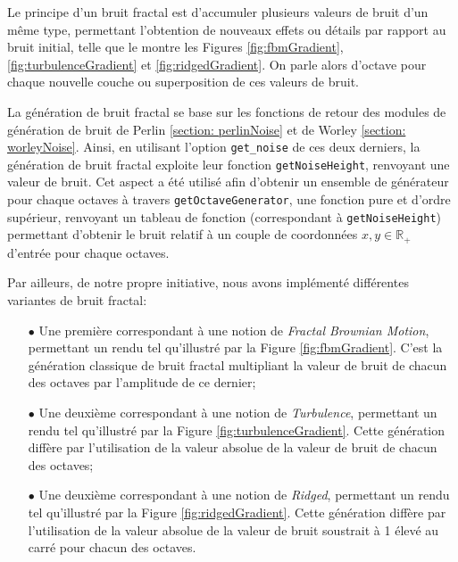 \documentclass[11pt]{article}
\begin{document}
Le principe d'un bruit fractal est d'accumuler plusieurs valeurs de bruit d'un même type, permettant l'obtention de nouveaux effets ou détails par rapport au bruit initial, telle que le montre les Figures \ref{fig:fbmGradient}, \ref{fig:turbulenceGradient} et \ref{fig:ridgedGradient}. On parle alors d'octave pour chaque nouvelle couche ou superposition de ces valeurs de bruit. \cite{fractalNoise}

La génération de bruit fractal se base sur les fonctions de retour des modules de génération de bruit de Perlin \ref{section: perlinNoise} et de Worley \ref{section: worleyNoise}. Ainsi, en utilisant l'option \texttt{get\_noise} de ces deux derniers, la génération de bruit fractal exploite leur fonction \texttt{getNoiseHeight}, renvoyant une valeur de bruit. Cet aspect a été utilisé afin d'obtenir un ensemble de générateur pour chaque octaves à travers \texttt{getOctaveGenerator}, une fonction pure et d'ordre supérieur, renvoyant un tableau de fonction (correspondant à \texttt{getNoiseHeight}) permettant d'obtenir le bruit relatif à un couple de coordonnées $x, y \in \mathbb{R}_{+}$ d'entrée pour chaque octaves.

Par ailleurs, de notre propre initiative, nous avons implémenté différentes variantes de bruit fractal:
\begin{itemize}
    \item [$\bullet$] Une première correspondant à une notion de \textit{Fractal Brownian Motion}, permettant un rendu tel qu'illustré par la Figure \ref{fig:fbmGradient}. C'est la génération classique de bruit fractal multipliant la valeur de bruit de chacun des octaves par l'amplitude de ce dernier;
    \item [$\bullet$] Une deuxième correspondant à une notion de \textit{Turbulence}, permettant un rendu tel qu'illustré par la Figure \ref{fig:turbulenceGradient}. Cette génération diffère par l'utilisation de la valeur absolue de la valeur de bruit de chacun des octaves;
    \item [$\bullet$] Une deuxième correspondant à une notion de \textit{Ridged}, permettant un rendu tel qu'illustré par la Figure \ref{fig:ridgedGradient}. Cette génération diffère par l'utilisation de la valeur absolue de la valeur de bruit soustrait à 1 élevé au carré pour chacun des octaves.
\end{itemize}
\end{document}
